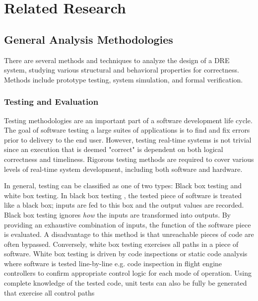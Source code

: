 \chapter{Related Research}
\label{chapter:related-research}

\section{General Analysis Methodologies}

There are several methods and techniques to analyze the design of a DRE system, studying various structural and behavioral properties for correctness. Methods include prototype testing, system simulation, and formal verification. 

\subsection{Testing and Evaluation}

Testing methodologies are an important part of a software development life cycle. The goal of software testing a large suites of applications is to find and fix errors prior to delivery to the end user. However, testing real-time systems is not trivial since an execution that is deemed "correct" is dependent on both logical correctness and timeliness. Rigorous testing methods are required to cover various levels of real-time system development, including both software and hardware. 

In general, testing can be classified as one of two types: Black box testing and white box testing. In black box testing \cite{krichen2004black}, the tested piece of software is treated like a black box; inputs are fed to this box and the output values are recorded. Black box testing ignores \emph{how} the inputs are transformed into outputs. By providing an exhaustive combination of inputs, the function of the software piece is evaluated. A disadvantage to this method is that unreachable pieces of code are often bypassed. Conversely, white box testing exercises all paths in a piece of software. White box testing is driven by code inspections or static code analysis where software is tested line-by-line e.g. code inspection in flight engine controllers to confirm appropriate control logic for each mode of operation. Using complete knowledge of the tested code, unit tests can also be fully be generated that exercise all control paths 


